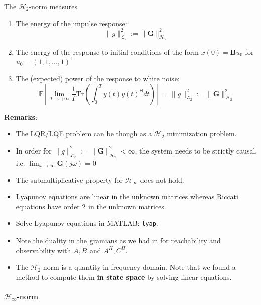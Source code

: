 
The $\mathcal{H}_2$-norm measures
\begin{enumerate}
    \item The energy of the impulse response:
          \noindent\begin{equation*}
              \|g\|_{\mathcal{L}_2}^2:= \|\mathbf{G}\|_{\mathcal{H}_2}^2
          \end{equation*}
    \item The energy of the response to initial conditions of the form $x(0)=\mathbf{B}u_0$ for $u_0={(1,1,\ldots, 1)}^{\mathsf{T}}$
    \item The (expected) power of the response to white noise:
          \noindent\begin{equation*}
              \mathbb{E}\left[\lim_{T\to+\infty}\frac{1}{T}\text{Tr}\left(\int_0^T y(t){y(t)}^{\mathsf{H}} dt\right)\right] =  \|g\|_{\mathcal{L}_2}^2:= \|\mathbf{G}\|_{\mathcal{H}_2}^2
          \end{equation*}
\end{enumerate}
\textbf{Remarks}:
\begin{itemize}
    \item The LQR/LQE problem can be though as a $\mathcal{H}_2$ minimization problem.
    \item In order for $\|g\|_{\mathcal{L}_2}^2:= \|\mathbf{G}\|_{\mathcal{H}_2}^2<\infty$, the system needs to be strictly causal, i.e. $\lim_{\omega\to\infty}\mathbf{G}(j\omega)=0$
    \item The submultiplicative property for $\mathcal{H}_\infty$ does not hold.
    \item Lyapunov equations are linear in the unknown matrices whereas Riccati equations have order 2 in the unknown matrices.
    \item Solve Lyapunov equations in MATLAB: \texttt{lyap}.
    \item Note the duality in the gramians as we had in for reachability and observability with $A,B$ and $A^H,C^H$.
    \item The $\mathcal{H}_2$ norm is a quantity in frequency domain. Note that we found a method to compute them \textbf{in state space} by solving linear equations.
\end{itemize}

\paragraph[Hinf-induced Norm]{$\mathcal{H}_{\infty}$-norm}

